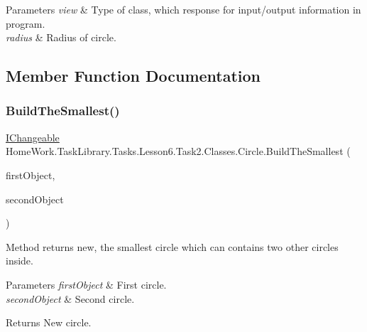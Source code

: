 \begin{DoxyParams}{Parameters}
{\em view} & Type of class, which response for input/output information in program.\\
\hline
{\em radius} & Radius of circle.\\
\hline
\end{DoxyParams}


\subsection{Member Function Documentation}
\mbox{\label{class_home_work_1_1_task_library_1_1_tasks_1_1_lesson6_1_1_task2_1_1_classes_1_1_circle_ab8d3d404b5c85359896d5789a804faac}} 
\subsubsection{\texorpdfstring{BuildTheSmallest()}{BuildTheSmallest()}}
{\footnotesize\ttfamily \mbox{\hyperlink{interface_home_work_1_1_task_library_1_1_tasks_1_1_lesson6_1_1_task2_1_1_interfaces_1_1_i_changeable}{I\+Changeable}} Home\+Work.\+Task\+Library.\+Tasks.\+Lesson6.\+Task2.\+Classes.\+Circle.\+Build\+The\+Smallest (\begin{DoxyParamCaption}\item[{\mbox{\hyperlink{interface_home_work_1_1_task_library_1_1_tasks_1_1_lesson6_1_1_task2_1_1_interfaces_1_1_i_changeable}{I\+Changeable}}}]{first\+Object,  }\item[{\mbox{\hyperlink{interface_home_work_1_1_task_library_1_1_tasks_1_1_lesson6_1_1_task2_1_1_interfaces_1_1_i_changeable}{I\+Changeable}}}]{second\+Object }\end{DoxyParamCaption})}



Method returns new, the smallest circle which can contains two other circles inside. 


\begin{DoxyParams}{Parameters}
{\em first\+Object} & First circle.\\
\hline
{\em second\+Object} & Second circle.\\
\hline
\end{DoxyParams}
\begin{DoxyReturn}{Returns}
New circle.
\end{DoxyReturn}


